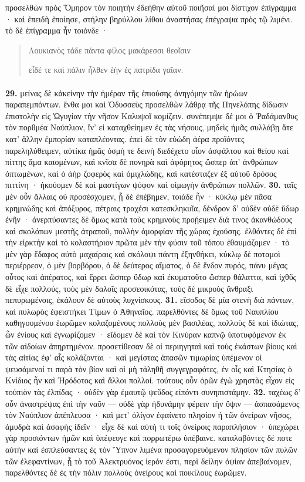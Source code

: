 \documentclass[a4paper, 11pt, oneside, polutonikogreek, german]{article}
\begin{document}
προσελθὼν πρὸς Ὅμηρον τὸν ποιητὴν ἐδεήθην αὐτοῦ ποιῆσαί μοι δίστιχον ἐπίγραμμα · καὶ ἐπειδὴ ἐποίησε, στήλην βηρύλλου λίθου ἀναστήσας ἐπέγραψα πρὸς τῷ λιμένι. τὸ δὲ ἐπίγραμμα ἦν τοιόνδε ·
\begin{quotation}
Λουκιανὸς τάδε πάντα φίλος μακάρεσσι θεοῖσιν

εἶδέ τε καὶ πάλιν ἦλθεν ἑὴν ἐς πατρίδα γαῖαν.
\end{quotation}
\paragraph{}
\textbf{29.} μείνας δὲ κἀκείνην τὴν ἡμέραν τῆς ἐπιούσης ἀνηγόμην τῶν ἡρώων παραπεμπόντων. ἔνθα μοι καὶ Ὀδυσσεὺς προσελθὼν λάθρᾳ τῆς Πηνελόπης δίδωσιν ἐπιστολὴν εἰς Ὠγυγίαν τὴν νῆσον Καλυψοῖ κομίζειν. συνέπεμψε δέ μοι ὁ Ῥαδάμανθυς τὸν πορθμέα Ναύπλιον, ἵν' εἰ καταχθείημεν ἐς τὰς νήσους, μηδεὶς ἡμᾶς συλλάβῃ ἅτε κατ' ἄλλην ἐμπορίαν καταπλέοντας. ἐπεὶ δὲ τὸν εὐώδη ἀέρα προϊόντες παρεληλύθειμεν, αὐτίκα ἡμᾶς ὀσμή τε δεινὴ διεδέχετο οἷον ἀσφάλτου καὶ θείου καὶ πίττης ἅμα καιομένων, καὶ κνῖσα δὲ πονηρὰ καὶ ἀφόρητος ὥσπερ ἀπ' ἀνθρώπων ὀπτωμένων, καὶ ὁ ἀὴρ ζοφερὸς καὶ ὁμιχλώδης, καὶ κατέσταζεν ἐξ αὐτοῦ δρόσος πιττίνη · ἠκούομεν δὲ καὶ μαστίγων ψόφον καὶ οἰμωγὴν ἀνθρώπων πολλῶν. \textbf{30.} ταῖς μὲν οὖν ἄλλαις οὐ προσέσχομεν, ᾗ δὲ ἐπέβημεν, τοιάδε ἦν · κύκλῳ μὲν πᾶσα κρημνώδης καὶ ἀπόξυρος, πέτραις τραχέσι κατεσκληκυῖα, δένδρον δ' οὐδὲν οὐδὲ ὕδωρ ἐνῆν · ἀνερπύσαντες δὲ ὅμως κατὰ τοὺς κρημνοὺς προῄειμεν διά τινος ἀκανθώδους καὶ σκολόπων μεστῆς ἀτραποῦ, πολλὴν ἀμορφίαν τῆς χώρας ἐχούσης. ἐλθόντες δὲ ἐπὶ τὴν εἱρκτὴν καὶ τὸ κολαστήριον πρῶτα μὲν τὴν φύσιν τοῦ τόπου ἐθαυμάζομεν · τὸ μὲν γὰρ ἔδαφος αὐτὸ μαχαίραις καὶ σκόλοψι πάντη ἐξηνθήκει, κύκλῳ δὲ ποταμοὶ περιέρρεον, ὁ μὲν βορβόρου, ὁ δὲ δεύτερος αἵματος, ὁ δὲ ἔνδον πυρός, πάνυ μέγας οὗτος καὶ ἀπέρατος, καὶ ἔρρει ὥσπερ ὕδωρ καὶ ἐκυματοῦτο ὥσπερ θάλαττα, καὶ ἰχθῦς δὲ εἶχε πολλούς, τοὺς μὲν δαλοῖς προσεοικότας, τοὺς δὲ μικροὺς ἄνθραξι πεπυρωμένοις, ἐκάλουν δὲ αὐτοὺς λυχνίσκους. \textbf{31.} εἴσοδος δὲ μία στενὴ διὰ πάντων, καὶ πυλωρὸς ἐφειστήκει Τίμων ὁ Ἀθηναῖος. παρελθόντες δὲ ὅμως τοῦ Ναυπλίου καθηγουμένου ἑωρῶμεν κολαζομένους πολλοὺς μὲν βασιλέας, πολλοὺς δὲ καὶ ἰδιώτας, ὧν ἐνίους καὶ ἐγνωρίζομεν · εἴδομεν δὲ καὶ τὸν Κινύραν καπνῷ ὑποτυφόμενον ἐκ τῶν αἰδοίων ἀπηρτημένον. προσετίθεσαν δὲ οἱ περιηγηταὶ καὶ τοὺς ἑκάστων βίους καὶ τὰς αἰτίας ἐφ' αἷς κολάζονται · καὶ μεγίστας ἁπασῶν τιμωρίας ὑπέμενον οἱ ψευσάμενοί τι παρὰ τὸν βίον καὶ οἱ μὴ τἀληθῆ συγγεγραφότες, ἐν οἷς καὶ Κτησίας ὁ Κνίδιος ἦν καὶ Ἡρόδοτος καὶ ἄλλοι πολλοί. τούτους οὖν ὁρῶν ἐγὼ χρηστὰς εἶχον εἰς τοὐπιὸν τὰς ἐλπίδας · οὐδὲν γὰρ ἐμαυτῷ ψεῦδος εἰπόντι συνηπιστάμην. \textbf{32.} ταχέως δ' οὖν ἀναστρέψας ἐπὶ τὴν ναῦν --- οὐδὲ γὰρ ἠδυνάμην φέρειν τὴν ὄψιν --- ἀσπασάμενος τὸν Ναύπλιον ἀπέπλευσα · καὶ μετ' ὀλίγον ἐφαίνετο πλησίον ἡ τῶν ὀνείρων νῆσος, ἀμυδρὰ καὶ ἀσαφὴς ἰδεῖν · εἶχε δὲ καὶ αὐτή τι τοῖς ὀνείροις παραπλήσιον · ὑπεχώρει γὰρ προσιόντων ἡμῶν καὶ ὑπέφευγε καὶ πορρωτέρω ὑπέβαινε. καταλαβόντες δέ ποτε αὐτὴν καὶ ἐσπλεύσαντες ἐς τὸν Ὕπνον λιμένα προσαγορευόμενον πλησίον τῶν πυλῶν τῶν ἐλεφαντίνων, ᾗ τὸ τοῦ Ἀλεκτρυόνος ἱερόν ἐστι, περὶ δείλην ὀψίαν ἀπεβαίνομεν, παρελθόντες δὲ ἐς τὴν πόλιν πολλοὺς ὀνείρους καὶ ποικίλους ἑωρῶμεν. 
\end{document}
